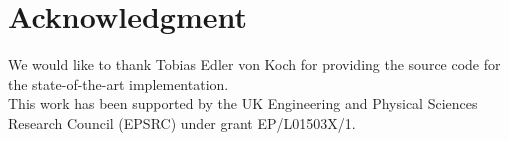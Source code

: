\documentclass[conference,10pt]{IEEEtran}
\begin{document}
\maketitle












%







\section*{Acknowledgment}
  We would like to thank Tobias Edler von Koch for providing the source
code for the state-of-the-art implementation.
  \\
  This work has been supported by the UK Engineering and Physical Sciences Research Council (EPSRC) under grant EP/L01503X/1.


%








\balance

\clearpage
\nobalance


\end{document}
